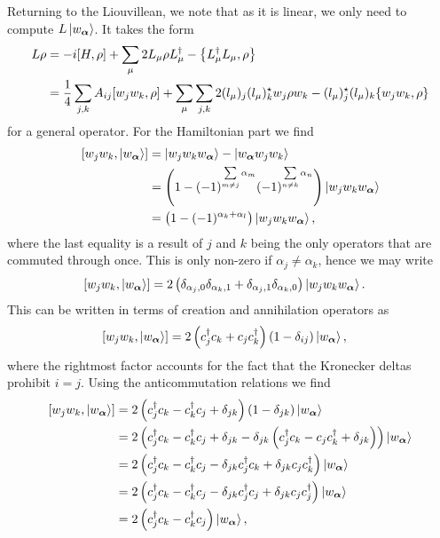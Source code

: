 Returning to the Liouvillean, we note that as it is linear, we only need to compute $L\ket{w_{\vb*{\alpha}}}$. It takes the form
\begin{align*}
	L\rho &= -i\comm{H}{\rho} + \sum\limits_{\mu}2L_{\mu}\rho L_{\mu}\adj - \acomm{L_{\mu}\adj L_{\mu}}{\rho} \\
	      &= \frac{1}{4}\sum\limits_{j, k}A_{ij}\comm{w_{j}w_{k}}{\rho} + \sum\limits_{\mu}\sum\limits_{j, k}2(l_{\mu})_{j}(l_{\mu})_{k}\cc w_{j}\rho w_{k} - (l_{\mu})_{j}\cc(l_{\mu})_{k}\acomm{w_{j}w_{k}}{\rho}
\end{align*}
for a general operator. For the Hamiltonian part we find
\begin{align*}
	\comm{w_{j}w_{k}}{\ket{w_{\vb*{\alpha}}}} &= \ket{w_{j}w_{k}w_{\vb*{\alpha}}} - \ket{w_{\vb*{\alpha}}w_{j}w_{k}} \\
	                                          &= \left(1 - (-1)^{\sum\limits_{m\neq j}\alpha_{m}}(-1)^{\sum\limits_{n\neq k}\alpha_{n}}\right)\ket{w_{j}w_{k}w_{\vb*{\alpha}}} \\
	                                          &= \left(1 - (-1)^{\alpha_{k} + \alpha_{l}}\right)\ket{w_{j}w_{k}w_{\vb*{\alpha}}},
\end{align*}
where the last equality is a result of $j$ and $k$ being the only operators that are commuted through once. This is only non-zero if $\alpha_{j} \neq \alpha_{k}$, hence we may write
\begin{align*}
	\comm{w_{j}w_{k}}{\ket{w_{\vb*{\alpha}}}} &= 2\left(\delta_{\alpha_{j}, 0}\delta_{\alpha_{k}, 1} + \delta_{\alpha_{j}, 1}\delta_{\alpha_{k}, 0}\right)\ket{w_{j}w_{k}w_{\vb*{\alpha}}}.
\end{align*}
This can be written in terms of creation and annihilation operators as
\begin{align*}
	\comm{w_{j}w_{k}}{\ket{w_{\vb*{\alpha}}}} &= 2\left(c_{j}\adj c_{k} + c_{j}c_{k}\adj\right)(1 - \delta_{ij})\ket{w_{\vb*{\alpha}}},
\end{align*}
where the rightmost factor accounts for the fact that the Kronecker deltas prohibit $i = j$. Using the anticommutation relations we find
\begin{align*}
	\comm{w_{j}w_{k}}{\ket{w_{\vb*{\alpha}}}} &= 2\left(c_{j}\adj c_{k} - c_{k}\adj c_{j} + \delta_{jk}\right)(1 - \delta_{jk})\ket{w_{\vb*{\alpha}}} \\
	                                          &= 2\left(c_{j}\adj c_{k} - c_{k}\adj c_{j} + \delta_{jk} - \delta_{jk}\left(c_{j}\adj c_{k} - c_{j}c_{k}\adj + \delta_{jk}\right)\right)\ket{w_{\vb*{\alpha}}} \\
	                                          &= 2\left(c_{j}\adj c_{k} - c_{k}\adj c_{j} - \delta_{jk}c_{j}\adj c_{k} + \delta_{jk}c_{j}c_{k}\adj\right)\ket{w_{\vb*{\alpha}}} \\
	                                          &= 2\left(c_{j}\adj c_{k} - c_{k}\adj c_{j} - \delta_{jk}c_{j}\adj c_{j} + \delta_{jk}c_{j}c_{j}\adj\right)\ket{w_{\vb*{\alpha}}} \\
	                                          &= 2\left(c_{j}\adj c_{k} - c_{k}\adj c_{j}\right)\ket{w_{\vb*{\alpha}}},
\end{align*}
